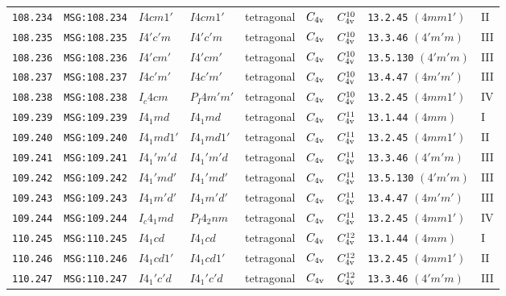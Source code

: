 \documentclass[fleqn,10pt]{jsarticle}
\begin{document}
\begin{center}
\begin{longtable}{lllllllll}
\texttt{108.234} & \texttt{MSG:108.234} & $I4cm1'$ & $I4cm1'$ & tetragonal & $C_{\rm 4v}$ & $C_{\rm 4v}^{10}$ & \texttt{13.2.45} $(4mm1')$ & II \\
\texttt{108.235} & \texttt{MSG:108.235} & $I4'c'm$ & $I4'c'm$ & tetragonal & $C_{\rm 4v}$ & $C_{\rm 4v}^{10}$ & \texttt{13.3.46} $(4'm'm)$ & III \\
\texttt{108.236} & \texttt{MSG:108.236} & $I4'cm'$ & $I4'cm'$ & tetragonal & $C_{\rm 4v}$ & $C_{\rm 4v}^{10}$ & \texttt{13.5.130} $(4'm'm)$ & III \\
\texttt{108.237} & \texttt{MSG:108.237} & $I4c'm'$ & $I4c'm'$ & tetragonal & $C_{\rm 4v}$ & $C_{\rm 4v}^{10}$ & \texttt{13.4.47} $(4m'm')$ & III \\
\texttt{108.238} & \texttt{MSG:108.238} & $I_{c}4cm$ & $P_{I}4m'm'$ & tetragonal & $C_{\rm 4v}$ & $C_{\rm 4v}^{10}$ & \texttt{13.2.45} $(4mm1')$ & IV \\ \hline
\texttt{109.239} & \texttt{MSG:109.239} & $I4_{1}md$ & $I4_{1}md$ & tetragonal & $C_{\rm 4v}$ & $C_{\rm 4v}^{11}$ & \texttt{13.1.44} $(4mm)$ & I \\
\texttt{109.240} & \texttt{MSG:109.240} & $I4_{1}md1'$ & $I4_{1}md1'$ & tetragonal & $C_{\rm 4v}$ & $C_{\rm 4v}^{11}$ & \texttt{13.2.45} $(4mm1')$ & II \\
\texttt{109.241} & \texttt{MSG:109.241} & $I4_{1}'m'd$ & $I4_{1}'m'd$ & tetragonal & $C_{\rm 4v}$ & $C_{\rm 4v}^{11}$ & \texttt{13.3.46} $(4'm'm)$ & III \\
\texttt{109.242} & \texttt{MSG:109.242} & $I4_{1}'md'$ & $I4_{1}'md'$ & tetragonal & $C_{\rm 4v}$ & $C_{\rm 4v}^{11}$ & \texttt{13.5.130} $(4'm'm)$ & III \\
\texttt{109.243} & \texttt{MSG:109.243} & $I4_{1}m'd'$ & $I4_{1}m'd'$ & tetragonal & $C_{\rm 4v}$ & $C_{\rm 4v}^{11}$ & \texttt{13.4.47} $(4m'm')$ & III \\
\texttt{109.244} & \texttt{MSG:109.244} & $I_{c}4_{1}md$ & $P_{I}4_{2}nm$ & tetragonal & $C_{\rm 4v}$ & $C_{\rm 4v}^{11}$ & \texttt{13.2.45} $(4mm1')$ & IV \\ \hline
\texttt{110.245} & \texttt{MSG:110.245} & $I4_{1}cd$ & $I4_{1}cd$ & tetragonal & $C_{\rm 4v}$ & $C_{\rm 4v}^{12}$ & \texttt{13.1.44} $(4mm)$ & I \\
\texttt{110.246} & \texttt{MSG:110.246} & $I4_{1}cd1'$ & $I4_{1}cd1'$ & tetragonal & $C_{\rm 4v}$ & $C_{\rm 4v}^{12}$ & \texttt{13.2.45} $(4mm1')$ & II \\
\texttt{110.247} & \texttt{MSG:110.247} & $I4_{1}'c'd$ & $I4_{1}'c'd$ & tetragonal & $C_{\rm 4v}$ & $C_{\rm 4v}^{12}$ & \texttt{13.3.46} $(4'm'm)$ & III \\

\end{longtable}
\end{center}
\end{document}
